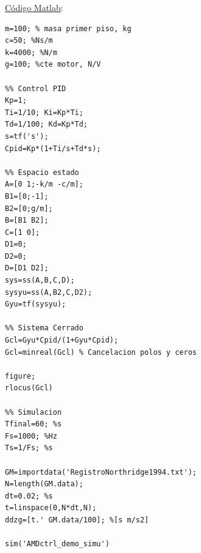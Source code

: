 


















\underline{Código Matlab}: 

\begin{lstlisting}[style=matlab-editor]
%% Parametros
m=100; % masa primer piso, kg
c=50; %Ns/m
k=4000; %N/m
g=100; %cte motor, N/V

%% Control PID
Kp=1;
Ti=1/10; Ki=Kp*Ti;
Td=1/100; Kd=Kp*Td;
s=tf('s');
Cpid=Kp*(1+Ti/s+Td*s);

%% Espacio estado
A=[0 1;-k/m -c/m];
B1=[0;-1];
B2=[0;g/m];
B=[B1 B2];
C=[1 0];
D1=0;
D2=0;
D=[D1 D2];
sys=ss(A,B,C,D);
sysyu=ss(A,B2,C,D2);
Gyu=tf(sysyu);

%% Sistema Cerrado
Gcl=Gyu*Cpid/(1+Gyu*Cpid);
Gcl=minreal(Gcl) % Cancelacion polos y ceros

figure;
rlocus(Gcl)

%% Simulacion
Tfinal=60; %s
Fs=1000; %Hz
Ts=1/Fs; %s

GM=importdata('RegistroNorthridge1994.txt');
N=length(GM.data);
dt=0.02; %s
t=linspace(0,N*dt,N);
ddzg=[t.' GM.data/100]; %[s m/s2]

sim('AMDctrl_demo_simu')
\end{lstlisting}


